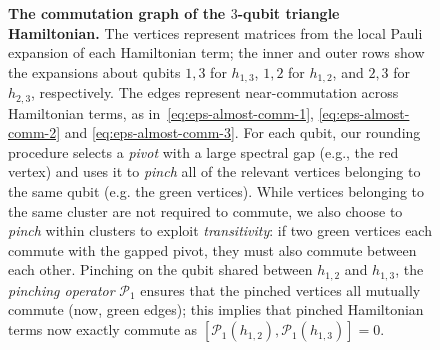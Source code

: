 \documentclass[a4paper,onecolumn,11pt]{quantumarticle}
\theoremstyle{plain}
\renewcommand{\C}{\mathbb{C}}
\begin{document}
\begin{figure}[t]

    \caption{\textbf{The commutation graph of the $3$-qubit triangle Hamiltonian.} 
    The vertices represent matrices from the local Pauli expansion of each Hamiltonian term;
the inner and outer rows show the expansions about qubits $1,3$ for $h_{1,3}$, $1,2$ for $h_{1,2}$, and $2,3$ for $h_{2,3}$, respectively. The edges represent near-commutation 
across Hamiltonian terms, as in~\eqref{eq:eps-almost-comm-1}, 
\eqref{eq:eps-almost-comm-2} and \eqref{eq:eps-almost-comm-3}. For each 
qubit, our rounding procedure selects a \emph{pivot} with a large 
spectral gap (e.g., the red vertex) and uses it to \emph{pinch} all of 
the relevant vertices belonging to the same qubit (e.g. the green 
vertices). While vertices belonging to the same cluster are not 
required to 
commute, we also choose to \emph{pinch} within clusters to exploit 
\emph{transitivity}: if two green vertices each commute with the gapped 
pivot, they must also commute between each other. Pinching on the qubit 
shared between $h_{1,2}$ and $h_{1,3}$, the \emph{pinching operator} 
$\mathcal{P}_1$ ensures that the pinched vertices all mutually commute 
(now, green edges); this implies that 
 pinched Hamiltonian terms now exactly commute as $[\mathcal{P}_1(h_{1,2}),\mathcal{P}_1(h_{1,3})]=0$.
 }\label{fig:triangle-Hamiltinonian-rounding}
\end{figure}
\end{document}
